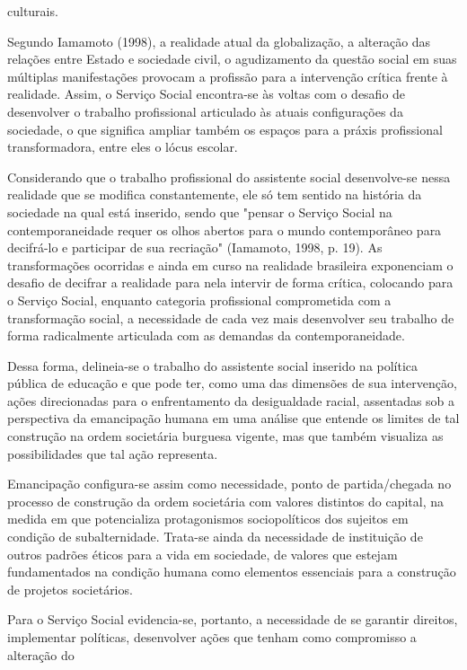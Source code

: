  culturais.\par Segundo Iamamoto (1998), a realidade atual da
 globalização, a alteração das relações entre Estado e sociedade civil, o agudizamento
 da questão social em suas múltiplas manifestações provocam a profissão para a
 intervenção crítica frente à realidade. Assim, o Serviço Social encontra-se às voltas
 com o desafio de desenvolver o trabalho profissional articulado às atuais
 configurações da sociedade, o que significa ampliar também os espaços para a práxis
 profissional transformadora, entre eles o lócus escolar.\par Considerando que o trabalho profissional do assistente social desenvolve-se nessa
 realidade que se modifica constantemente, ele só tem sentido na história da sociedade
 na qual está inserido, sendo que "pensar o Serviço Social na contemporaneidade requer
 os olhos abertos para o mundo contemporâneo para decifrá-lo e participar de sua
 recriação" (Iamamoto, 1998, p. 19). As
 transformações ocorridas e ainda em curso na realidade brasileira exponenciam o
 desafio de decifrar a realidade para nela intervir de forma crítica, colocando para o
 Serviço Social, enquanto categoria profissional comprometida com a transformação
 social, a necessidade de cada vez mais desenvolver seu trabalho de forma radicalmente
 articulada com as demandas da contemporaneidade.\par Dessa forma, delineia-se o trabalho do assistente social inserido na política pública
 de educação e que pode ter, como uma das dimensões de sua intervenção, ações
 direcionadas para o enfrentamento da desigualdade racial, assentadas sob a
 perspectiva da emancipação humana em uma análise que entende os limites de tal
 construção na ordem societária burguesa vigente, mas que também visualiza as
 possibilidades que tal ação representa.\par Emancipação configura-se assim como necessidade, ponto de partida/chegada no processo
 de construção da ordem societária com valores distintos do capital, na medida em que
 potencializa protagonismos sociopolíticos dos sujeitos em condição de subalternidade.
 Trata-se ainda da necessidade de instituição de outros padrões éticos para a vida em
 sociedade, de valores que estejam fundamentados na condição humana como elementos
 essenciais para a construção de projetos societários.\par Para o Serviço Social evidencia-se, portanto, a necessidade de se garantir direitos,
 implementar políticas, desenvolver ações que tenham como compromisso a alteração do
